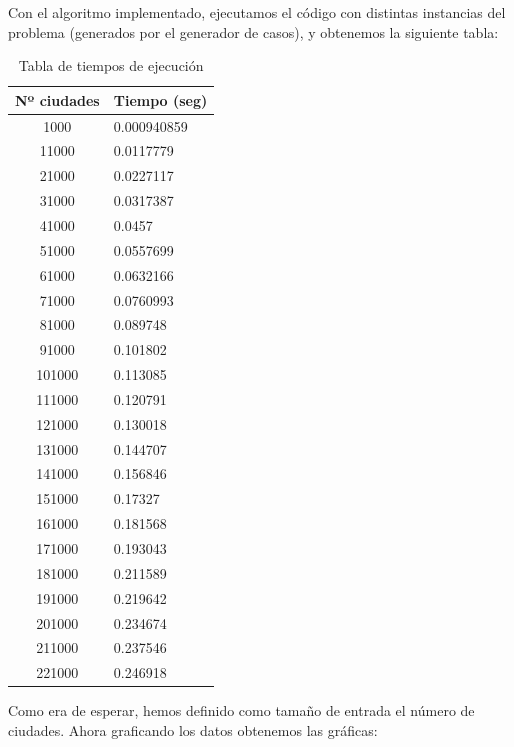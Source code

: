 \documentclass{article}
\begin{document}
    Con el algoritmo implementado, ejecutamos el código con distintas instancias del problema (generados por el generador de casos),  y obtenemos la siguiente tabla:
    \begin{table}[H]
        \centering
        \begin{tabular}{|c|l|}
            \hline
            Nº ciudades & Tiempo (seg) \\
            \hline
            1000   & 0.000940859  \\
            11000  & 0.0117779    \\
            21000  & 0.0227117    \\
            31000  & 0.0317387    \\
            41000  & 0.0457       \\
            51000  & 0.0557699    \\
            61000  & 0.0632166    \\
            71000  & 0.0760993    \\
            81000  & 0.089748     \\
            91000  & 0.101802     \\
            101000 & 0.113085     \\
            111000 & 0.120791     \\
            121000 & 0.130018     \\
            131000 & 0.144707     \\
            141000 & 0.156846     \\
            151000 & 0.17327      \\
            161000 & 0.181568     \\
            171000 & 0.193043     \\
            181000 & 0.211589     \\
            191000 & 0.219642     \\
            201000 & 0.234674     \\
            211000 & 0.237546     \\
            221000 & 0.246918     \\ \hline
        \end{tabular}
        \caption{Tabla de tiempos de ejecución}
    \end{table}

    Como era de esperar, hemos definido como tamaño de entrada el número de ciudades. Ahora graficando los datos obtenemos las gráficas:
\end{document}
